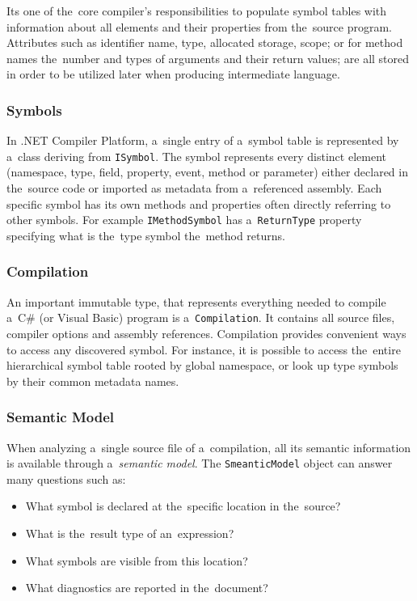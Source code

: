 \documentclass[
  digital, %
  table,   %
  lof,     %
  lot,     %
  oneside,
]{fithesis3}
\begin{document}
Its one of the~core compiler's responsibilities to populate symbol tables with information about all elements and their properties from the~source program. Attributes such as identifier name, type, allocated storage, scope; or for method names the~number and types of arguments and their return values; are all stored in order to be utilized later when producing intermediate language.

\subsubsection{\textbf{Symbols}}
In .NET Compiler Platform, a~single entry of a~symbol table is represented by a~class deriving from \texttt{ISymbol}. The symbol represents every distinct element (namespace, type, field, property, event, method or parameter) either declared in the~source code or imported as metadata from a~referenced assembly. Each specific symbol has its own methods and properties often directly referring to other symbols. For example \texttt{IMethodSymbol} has a~\texttt{ReturnType} property specifying what is the~type symbol the~method returns.

\subsubsection{\textbf{Compilation}}
An important immutable type, that represents everything needed to compile a~C\# (or Visual Basic) program is a~\texttt{Compilation}. It contains all source files, compiler options and assembly references. Compilation provides convenient ways to access any discovered symbol. For instance, it is possible to access the~entire hierarchical symbol table rooted by global namespace, or look up type symbols by their common metadata names.

\subsubsection{\textbf{Semantic Model}}
When analyzing a~single source file of a~compilation, all its semantic information is available through a~\textit{semantic model}. The \texttt{SmeanticModel} object can answer many questions such as:
  \begin{itemize}
  \item What symbol is declared at the~specific location in the~source?
  \item What is the~result type of an~expression?
  \item What symbols are visible from this location?
  \item What diagnostics are reported in the~document?
  \end{itemize}
 
\end{document}
